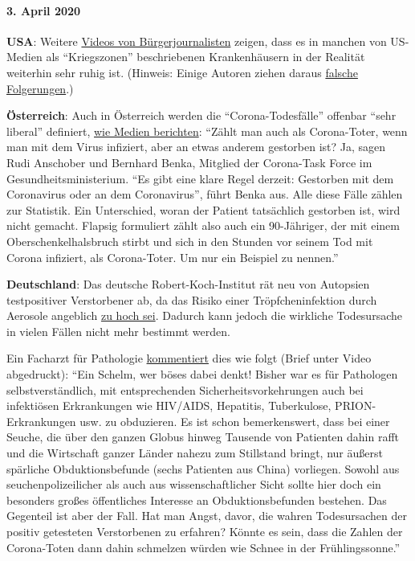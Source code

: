\hypertarget{3-april-2020}{%
\paragraph{3. April 2020}\label{3-april-2020}}

\textbf{USA}: Weitere
\href{https://www.youtube.com/watch?v=5pIMD1enwd4}{Videos von
Bürgerjournalisten} zeigen, dass es in manchen von US-Medien als
``Kriegszonen'' beschriebenen Krankenhäusern in der Realität weiterhin
sehr ruhig ist. (Hinweis: Einige Autoren ziehen daraus
\href{https://www.politifact.com/factchecks/2020/apr/03/facebook-posts/hospital-beds-being-kept-empty-prepare-covid-influ/}{falsche
Folgerungen}.)

\textbf{Österreich}: Auch in Österreich werden die ``Corona-Todesfälle''
offenbar ``sehr liberal'' definiert,
\href{https://www.heute.at/s/osterreich-bei-corona-todesstatistik-sehr-liberal-48665863}{wie
Medien berichten}: ``Zählt man auch als Corona-Toter, wenn man mit dem
Virus infiziert, aber an etwas anderem gestorben ist? Ja, sagen Rudi
Anschober und Bernhard Benka, Mitglied der Corona-Task Force im
Gesundheitsministerium. ``Es gibt eine klare Regel derzeit: Gestorben
mit dem Coronavirus oder an dem Coronavirus'', führt Benka aus. Alle
diese Fälle zählen zur Statistik. Ein Unterschied, woran der Patient
tatsächlich gestorben ist, wird nicht gemacht. Flapsig formuliert zählt
also auch ein 90-Jähriger, der mit einem Oberschenkelhalsbruch stirbt
und sich in den Stunden vor seinem Tod mit Corona infiziert, als
Corona-Toter. Um nur ein Beispiel zu nennen.''

\textbf{Deutschland}: Das deutsche Robert-Koch-Institut rät neu von
Autopsien testpositiver Verstorbener ab, da das Risiko einer
Tröpfcheninfektion durch Aerosole angeblich
\href{https://www.youtube.com/watch?v=gSn_YaOYYcY}{zu hoch sei}. Dadurch
kann jedoch die wirkliche Todesursache in vielen Fällen nicht mehr
bestimmt werden.

Ein Facharzt für Pathologie
\href{https://www.youtube.com/watch?v=gSn_YaOYYcY}{kommentiert} dies wie
folgt (Brief unter Video abgedruckt): ``Ein Schelm, wer böses dabei
denkt! Bisher war es für Pathologen selbstverständlich, mit
entsprechenden Sicherheitsvorkehrungen auch bei infektiösen Erkrankungen
wie HIV/AIDS, Hepatitis, Tuberkulose, PRION-Erkrankungen usw. zu
obduzieren. Es ist schon bemerkenswert, dass bei einer Seuche, die über
den ganzen Globus hinweg Tausende von Patienten dahin rafft und die
Wirtschaft ganzer Länder nahezu zum Stillstand bringt, nur äußerst
spärliche Obduktionsbefunde (sechs Patienten aus China) vorliegen.
Sowohl aus seuchenpolizeilicher als auch aus wissenschaftlicher Sicht
sollte hier doch ein besonders großes öffentliches Interesse an
Obduktionsbefunden bestehen. Das Gegenteil ist aber der Fall. Hat man
Angst, davor, die wahren Todesursachen der positiv getesteten
Verstorbenen zu erfahren? Könnte es sein, dass die Zahlen der
Corona-Toten dann dahin schmelzen würden wie Schnee in der
Frühlingssonne.''

